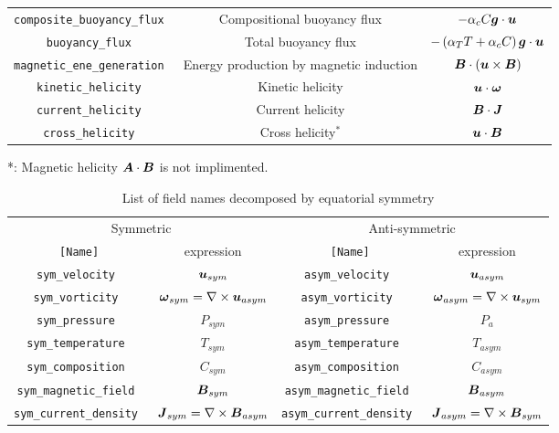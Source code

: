\begin{table}[htp]
\begin{center}
\begin{tabular}{|c|c|c|}
\tt composite\_buoyancy\_flux & Compositional buoyancy flux & $ -\alpha_{c} C \mbox{\boldmath$g$} \cdot \mbox{\boldmath$u$} $ \\
\tt buoyancy\_flux & Total buoyancy flux & $ -\left(\alpha_{T} T + \alpha_{c} C \right) \mbox{\boldmath$g$} \cdot \mbox{\boldmath$u$} $ \\
\tt magnetic\_ene\_generation & Energy production by magnetic induction
 & $  \mbox{\boldmath$B$} \cdot \left( \mbox{\boldmath$u$} \times \mbox{\boldmath$B$} \right) $ \\ 
\hline
\tt kinetic\_helicity & Kinetic helicity & $  \mbox{\boldmath$u$} \cdot \mbox{\boldmath$\omega$} $ \\
\tt current\_helicity & Current helicity & $  \mbox{\boldmath$B$} \cdot \mbox{\boldmath$J$} $ \\
\tt cross\_helicity & Cross helicity$^{*}$ & $  \mbox{\boldmath$u$} \cdot \mbox{\boldmath$B$} $ \\
\hline
\end{tabular}
\end{center}
*: Magnetic helicity $\mbox{\boldmath$A$} \cdot \mbox{\boldmath$B$} $ is not implimented.
\label{table:fields2}
\end{table}
%
\begin{table}[htp]
\caption{List of field names decomposed by equatorial symmetry}
\begin{center}
\begin{tabular}{|cc|cc|}
\hline
\multicolumn{2}{|c|}{Symmetric} & \multicolumn{2}{c|}{Anti-symmetric} \\
 {\tt [Name]}  & expression  & {\tt [Name]}  &  expression \\ \hline \hline
\tt sym\_velocity &  $\mbox{\boldmath$u$}_{sym}$ &  \tt asym\_velocity &  $\mbox{\boldmath$u$}_{asym}$  \\
\tt sym\_vorticity & $\mbox{\boldmath$\omega$}_{sym} = \nabla \times \mbox{\boldmath$u$}_{asym} $
     & \tt asym\_vorticity & $\mbox{\boldmath$\omega$}_{asym} = \nabla \times \mbox{\boldmath$u$}_{sym} $ \\
\tt sym\_pressure  & $P_{sym}$  & \tt asym\_pressure  & $P_{a}$ \\ \hline
\tt sym\_temperature & $T_{sym}$ & \tt asym\_temperature  & $T_{asym}$ \\
\tt sym\_composition & $C_{sym}$ & \tt asym\_composition & $C_{asym}$ \\ \hline
\tt sym\_magnetic\_field & $\mbox{\boldmath$B$}_{sym}$ & \tt asym\_magnetic\_field  & $\mbox{\boldmath$B$}_{asym}$ \\
\tt sym\_current\_density & $\mbox{\boldmath$J$}_{sym} = \nabla \times \mbox{\boldmath$B$}_{asym} $
     & \tt asym\_current\_density  & $\mbox{\boldmath$J$}_{asym} = \nabla \times \mbox{\boldmath$B$}_{sym} $ \\ \hline
\end{tabular}
\end{center}
\label{table:fields_sym}
\end{table}
